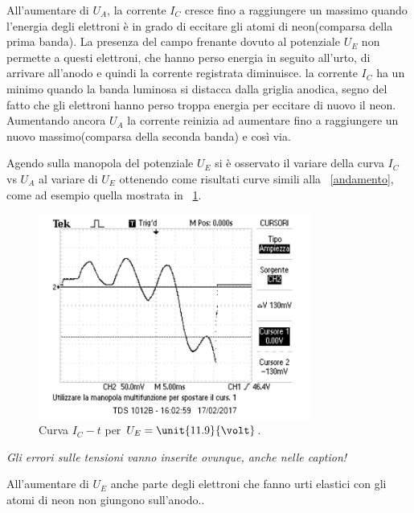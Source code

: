 \documentclass[10pt,a4paper]{article}
\begin{document}
All'aumentare di $U_{A}$, la corrente $I_{C}$ cresce fino a raggiungere un massimo quando l'energia degli elettroni è in grado di eccitare gli atomi di neon(comparsa della prima banda). La presenza del campo frenante dovuto al potenziale $U_{E}$ non permette a questi elettroni, che hanno perso energia in seguito all'urto, di arrivare all'anodo e quindi la corrente registrata diminuisce. la corrente $I_{C}$ ha un minimo quando la banda luminosa si distacca dalla griglia anodica, segno del fatto che gli elettroni hanno perso troppa energia per eccitare di nuovo il neon.
Aumentando ancora $U_{A}$ la corrente reinizia ad aumentare fino a raggiungere un nuovo massimo(comparsa della seconda banda) e così via.

Agendo sulla manopola del potenziale $U_{E}$ si è osservato il variare della curva $I_{C}$ vs $U_{A}$ al variare di $U_{E}$ ottenendo come risultati curve simili alla \figurename{~\ref{andamento}}, come ad esempio quella mostrata in \figurename{~\ref{task5}}.


\begin{figure}[h!]
	\centering
		\includegraphics[width=0.80\textwidth]{../oscilloscopio/task5.png}
	\caption{Curva $I_{C} - t$ per $U_{E}=\unit{11.9}{\volt}$.}
	\label{task5}
\end{figure}

\emph{Gli errori sulle tensioni vanno inserite ovunque, anche nelle caption!}

All'aumentare di $U_{E}$ anche parte degli elettroni che fanno urti elastici con gli atomi di neon non giungono sull'anodo..%
  
\end{document}
